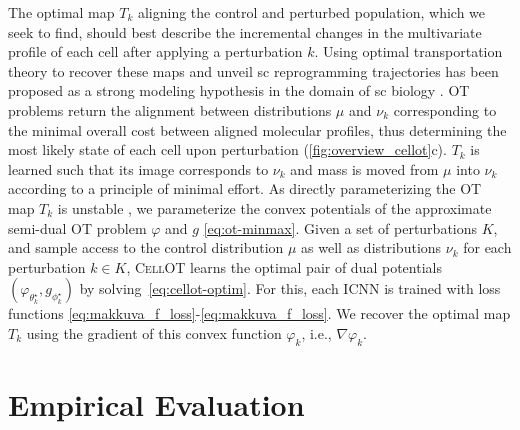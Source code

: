  The optimal map $T_k$ aligning the control and perturbed population, which we seek to find, should best describe the incremental changes in the multivariate profile of each cell after applying a perturbation $k$. Using optimal transportation theory \citep{villani2021topics, santambrogio2015optimal} to recover these maps and unveil \acrlong{sc} reprogramming trajectories has been proposed as a strong modeling hypothesis in the domain of \acrlong{sc} biology \citep{schiebinger2019optimal, cang2020inferring, demetci2022scot, huizing2022optimal, lavenant2021towards, zhang2021optimal}.
\Acrlong{OT} problems return the alignment between distributions $\mu$ and $\nu_k$ corresponding to the minimal overall cost between aligned molecular profiles, thus determining the most likely state of each cell upon perturbation (\cref{fig:overview_cellot}c).
$T_k$ is learned such that its image corresponds to $\nu_k$ and mass is moved from $\mu$ into $\nu_k$ according to a principle of minimal effort.
As directly parameterizing the \acrlong{OT} map $T_k$ \citep{korotin2021wasserstein, yang2018scalable, prasad2020optimal} is unstable \citep[Table 1]{makkuva2020optimal}, we parameterize the convex potentials of the approximate semi-dual \acrlong{OT} problem $\varphi$ and $g$ \eqref{eq:ot-minmax}.
Given a set of perturbations $K$, and sample access to the control distribution $\mu$ as well as  distributions $\nu_k$ for each perturbation $k \in K$, \textsc{CellOT} learns the optimal pair of dual potentials $(\varphi_{\theta_k^\star}, g_{\phi_k^\star})$ by solving~\eqref{eq:cellot-optim}.
For this, each \acrlong{ICNN} \citep{amos2017input} is trained with loss functions \eqref{eq:makkuva_f_loss}-\eqref{eq:makkuva_f_loss}. We recover the optimal map $T_k$ using the gradient of this convex function $\varphi_k$, i.e., $\nabla \varphi_k$.

\section{Empirical Evaluation}

